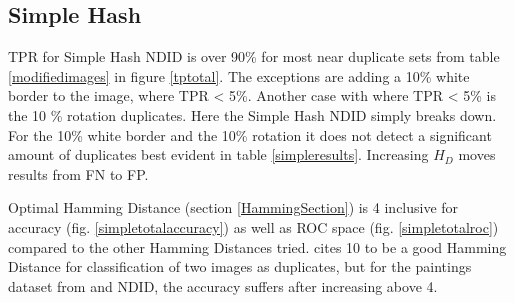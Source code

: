 \documentclass[english,12pt,a4paper,pdftex,elec,utf8]{aaltothesis}
\begin{document}
\subsection{Simple Hash}
TPR for Simple Hash NDID is over 90\% for most near duplicate sets from table \ref{modifiedimages} in figure \ref{tptotal}. The exceptions are adding a 10\% white border to the image, where TPR < 5\%. Another case with where TPR < 5\% is the 10 \% rotation duplicates. Here the Simple Hash NDID simply breaks down. For the 10\% white border and the 10\% rotation it does not detect a significant amount of duplicates best evident in table \ref{simpleresults}. Increasing $H_D$ moves results from FN to FP.

Optimal Hamming Distance (section \ref{HammingSection}) is 4 inclusive for accuracy (fig. \ref{simpletotalaccuracy}) as well as ROC space (fig. \ref{simpletotalroc}) compared to the other Hamming Distances tried. \cite{Zauner2010} cites 10 to be a good Hamming Distance for classification of two images as duplicates, but for the paintings dataset from \cite{Vedaldi2012} and NDID, the accuracy suffers after increasing above 4.
\end{document}
